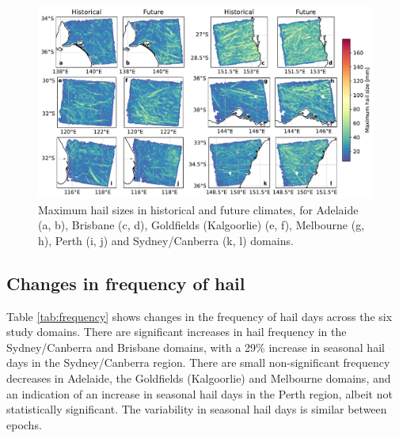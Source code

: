 \documentclass[]{agujournal2019}\usepackage[]{graphicx}\usepackage[]{xcolor}
\begin{document}
\begin{figure}[!h]
      \includegraphics[width=\textwidth]{figures/max_hail_sizes_by_domain}
      \caption{Maximum hail sizes in historical and future climates, for Adelaide (a, b), Brisbane (c, d), Goldfields (Kalgoorlie) (e, f), Melbourne (g, h), Perth (i, j) and Sydney/Canberra (k, l) domains.}
      \label{fig:max_hail_sizes_by_domain}
\end{figure}

\subsection{Changes in frequency of hail}

Table \ref{tab:frequency} shows changes in the frequency of hail days across the six study domains. There are significant increases in hail frequency in the Sydney/Canberra and Brisbane domains, with a 29\% increase in seasonal hail days in the Sydney/Canberra region. There are small non-significant frequency decreases in Adelaide, the Goldfields (Kalgoorlie) and Melbourne domains, and an indication of an increase in seasonal hail days in the Perth region, albeit not statistically significant. The variability in seasonal hail days is similar between epochs.
\end{document}
